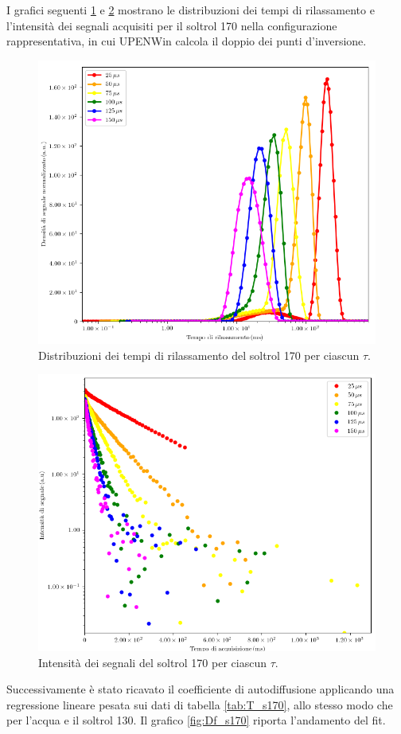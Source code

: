 I grafici seguenti \ref{fig:D_s170} e \ref{fig:S_s170} mostrano le distribuzioni dei tempi di rilassamento e l'intensità dei segnali acquisiti per il soltrol 170 nella configurazione rappresentativa, in cui UPENWin calcola il doppio dei punti d'inversione.

\begin{figure}[h!]
\centering
\includegraphics[width=\columnwidth]{Figure/SOLTROL170.png}
\caption{Distribuzioni dei tempi di rilassamento del soltrol 170 per ciascun $\tau$.}
\label{fig:D_s170}
\end{figure}

\begin{figure}[h!]
\centering
\includegraphics[width=\columnwidth]{Figure/SOLTROL170_SigTSig.png}
\caption{Intensità dei segnali del soltrol 170 per ciascun $\tau$.}
\label{fig:S_s170}
\end{figure}
\newpage Successivamente è stato ricavato il coefficiente di autodiffusione applicando una regressione lineare pesata sui dati di tabella \ref{tab:T_s170}, allo stesso modo che per l'acqua e il soltrol 130.
Il grafico \ref{fig:Df_s170} riporta l'andamento del fit.

